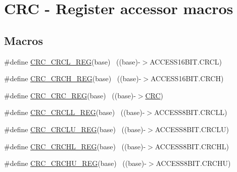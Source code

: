 \hypertarget{group___c_r_c___register___accessor___macros}{}\section{C\+RC -\/ Register accessor macros}
\label{group___c_r_c___register___accessor___macros}
\subsection*{Macros}
\begin{DoxyCompactItemize}
\item 
\#define \hyperlink{group___c_r_c___register___accessor___macros_gabad31d8dfe12ca85567b1e6b9027ff66}{C\+R\+C\+\_\+\+C\+R\+C\+L\+\_\+\+R\+EG}(base)                                          ~((base)-\/$>$A\+C\+C\+E\+S\+S16\+B\+I\+T.\+C\+R\+CL)
\item 
\#define \hyperlink{group___c_r_c___register___accessor___macros_ga25a983be1195cec12e80bd5fd70d6bdb}{C\+R\+C\+\_\+\+C\+R\+C\+H\+\_\+\+R\+EG}(base)                                          ~((base)-\/$>$A\+C\+C\+E\+S\+S16\+B\+I\+T.\+C\+R\+CH)
\item 
\#define \hyperlink{group___c_r_c___register___accessor___macros_ga8c19463133fc11b80ce6beaa0559b049}{C\+R\+C\+\_\+\+C\+R\+C\+\_\+\+R\+EG}(base)                                            ~((base)-\/$>$\hyperlink{group___peripheral__declaration_ga4381bb54c2dbc34500521165aa7b89b1}{C\+RC})
\item 
\#define \hyperlink{group___c_r_c___register___accessor___macros_gadd29ee6c1be896d6a29e47087c6fc8c5}{C\+R\+C\+\_\+\+C\+R\+C\+L\+L\+\_\+\+R\+EG}(base)                                        ~((base)-\/$>$A\+C\+C\+E\+S\+S8\+B\+I\+T.\+C\+R\+C\+LL)
\item 
\#define \hyperlink{group___c_r_c___register___accessor___macros_gac563a3cd40ed051f1580525b3d997196}{C\+R\+C\+\_\+\+C\+R\+C\+L\+U\+\_\+\+R\+EG}(base)                                        ~((base)-\/$>$A\+C\+C\+E\+S\+S8\+B\+I\+T.\+C\+R\+C\+LU)
\item 
\#define \hyperlink{group___c_r_c___register___accessor___macros_ga89be07710e8d08250ca3b8dcbf6dd7ad}{C\+R\+C\+\_\+\+C\+R\+C\+H\+L\+\_\+\+R\+EG}(base)                                        ~((base)-\/$>$A\+C\+C\+E\+S\+S8\+B\+I\+T.\+C\+R\+C\+HL)
\item 
\#define \hyperlink{group___c_r_c___register___accessor___macros_ga4cf80e6cff3baf934f320fa9d78e3723}{C\+R\+C\+\_\+\+C\+R\+C\+H\+U\+\_\+\+R\+EG}(base)                                        ~((base)-\/$>$A\+C\+C\+E\+S\+S8\+B\+I\+T.\+C\+R\+C\+HU)

\end{DoxyCompactItemize}

